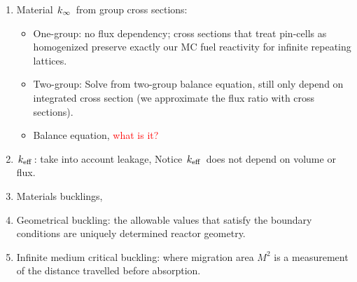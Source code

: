 \documentclass{school-22.211-notes}
\date{April 12, 2012}
\begin{document}
\maketitle

\begin{enumerate}

\item Material $\left. k_{\infty} \right.$ from group cross sections: 
  \begin{itemize}
  \item One-group: no flux dependency; cross sections that treat pin-cells as homogenized preserve exactly our MC fuel reactivity for infinite repeating lattices. 
  \item Two-group: Solve from two-group balance equation, still only depend on integrated cross section (we approximate the flux ratio with cross sections). 
  \item Balance equation, \textcolor{red}{what is it?} 
  \end{itemize}

\item $\left. k_{\mathrm{eff}} \right.$: take into account leakage,
  Notice $\left. k_{\mathrm{eff}} \right.$ does not depend on volume or flux. 

\item Materials bucklings,

\item Geometrical buckling: the allowable values that satisfy the boundary conditions are uniquely determined reactor geometry. 


\item Infinite medium critical buckling:
  where migration area $M^2$ is a measurement of the distance travelled before absorption. 


\end{enumerate}
\end{document}
